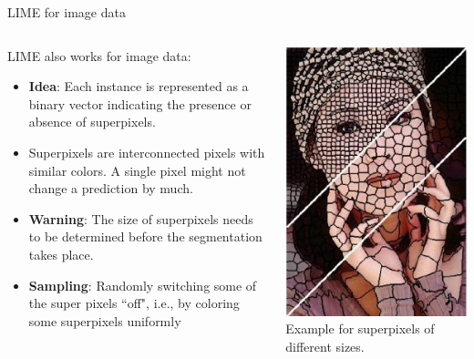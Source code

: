 \documentclass[11pt,compress,t,notes=noshow, aspectratio=169, xcolor=table]{beamer}
\begin{document}
\begin{frame}[c]{LIME for image data}
	\begin{columns}
		\begin{column}{0.67\textwidth}
			LIME also works for image data:  
			\begin{itemize}
				\item \textbf{Idea}: Each instance is represented as a binary vector indicating the presence or absence of superpixels. 
				\item Superpixels are interconnected pixels with similar colors. A single pixel might not change a prediction by much.
				\item \textbf{Warning}: The size of superpixels needs to be determined before the segmentation takes place.
				\item \textbf{Sampling}: Randomly switching some of the super pixels ``off", i.e., by coloring some superpixels uniformly
			\end{itemize}		
		\end{column}
		\begin{column}{0.26\textwidth}  
			\begin{center}
				\includegraphics[width=1\textwidth]{figure/superpixel_woman}
				{Example for superpixels of different sizes.}
			\end{center}
		\end{column}
	\end{columns}
    

\end{frame}
\end{document}
